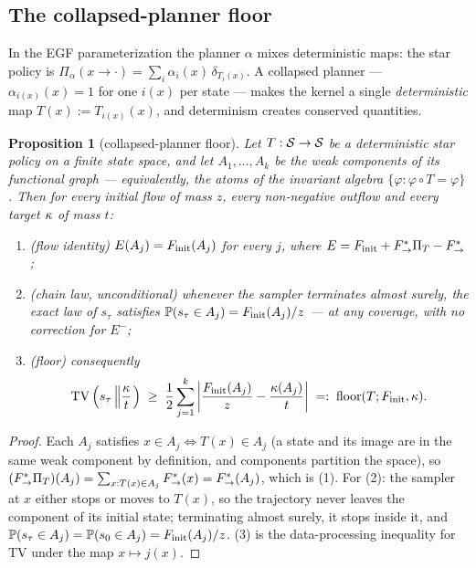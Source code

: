 \documentclass[11pt]{article}
\newtheorem{proposition}[theorem]{Proposition}
\theoremstyle{definition}
\theoremstyle{remark}
\begin{document}
\subsection{The collapsed-planner floor}\label{sec:collapse_floor_notes}

In the EGF parameterization the planner $\alpha$ mixes deterministic maps: the star
policy is $\Pi_\alpha(x\rightarrow\cdot)=\sum_i\alpha_i(x)\,\delta_{T_i(x)}$. A collapsed
planner --- $\alpha_{i(x)}(x)=1$ for one $i(x)$ per state --- makes the kernel a single
\emph{deterministic} map $T(x):=T_{i(x)}(x)$, and determinism creates conserved
quantities.

\begin{proposition}[collapsed-planner floor]\label{prop:collapse_floor_notes}
Let $T:\mathcal S\rightarrow\mathcal S$ be a deterministic star policy on a finite
state space, and let $A_1,\dots,A_k$ be the weak components of its functional graph ---
equivalently, the atoms of the invariant algebra $\{\varphi:\varphi\circ T=\varphi\}$.
Then for \emph{every} initial flow of mass $z$, every non-negative outflow and every
target $\kappa$ of mass $t$:
\begin{enumerate}
    \item \emph{(flow identity)} $E(A_j)=F_{\mathrm{init}}(A_j)$ for every $j$, where
    $E=F_{\mathrm{init}}+F^*_{\rightarrow}\Pi_T-F^*_{\rightarrow}$;
    \item \emph{(chain law, unconditional)} whenever the sampler terminates almost
    surely, the exact law of $s_\tau$ satisfies
    $\mathbb P(s_\tau\in A_j)=F_{\mathrm{init}}(A_j)/z$ --- at \emph{any} coverage, with no
    correction for $E^-$;
    \item \emph{(floor)} consequently
    \begin{equation}\label{equ:collapse_floor_notes}
        \mathrm{TV}\left(s_\tau\left\|\frac{\kappa} t\right.\right)\;\geq\;
        \frac12\sum_{j=1}^k\left|\frac{F_{\mathrm{init}}(A_j)}{z}-\frac{\kappa(A_j)}{t}\right|
        \;=:\;\mathrm{floor}(T;F_{\mathrm{init}},\kappa).
    \end{equation}
\end{enumerate}
\end{proposition}

\begin{proof}
Each $A_j$ satisfies $x\in A_j\Leftrightarrow T(x)\in A_j$ (a state and its image are in
the same weak component by definition, and components partition the space), so
$(F^*_{\rightarrow}\Pi_T)(A_j)=\sum_{x:T(x)\in A_j}F^*_{\rightarrow}(x)=F^*_{\rightarrow}(A_j)$, which is (1).
For (2): the sampler at $x$ either stops or moves to $T(x)$, so the trajectory never
leaves the component of its initial state; terminating almost surely, it stops inside it,
and $\mathbb P(s_\tau\in A_j)=\mathbb P(s_0\in A_j)=F_{\mathrm{init}}(A_j)/z$. (3) is the
data-processing inequality for TV under the map $x\mapsto j(x)$.
\end{proof}
\end{document}
